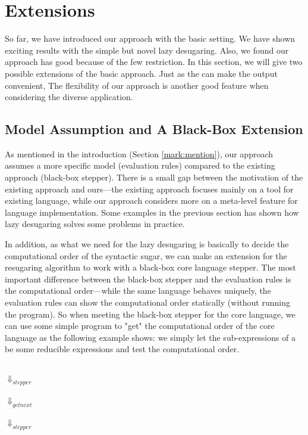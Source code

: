 \section{Extensions}
\label{sec:ext}

So far, we have introduced our approach with the basic setting. We have shown exciting results with the simple but novel lazy desugaring. Also, we found our approach has good because of the few restriction. In this section, we will give two possible extensions of the basic approach. Just as the  can make the output convenient, The flexibility of our approach is another good feature when considering the diverse application.

\subsection{Model Assumption and A Black-Box Extension}


As mentioned in the introduction (Section \ref{mark:mention}), our approach assumes a more specific model (evaluation rules) compared to the existing approach (black-box stepper). There is a small gap between the motivation of the existing approach and ours---the existing approach focuses mainly on a tool for existing language, while our approach considers more on a meta-level feature for language implementation. Some examples in the previous section has shown how lazy desugaring solves some problems in practice.

In addition, as what we need for the lazy desugaring is basically to decide the computational order of the syntactic sugar, we can make an extension for the resugaring algorithm to work with a black-box core language stepper. The most important difference between the black-box stepper and the evaluation rules is the computational order---while the same language behaves uniquely, the evaluation rules can show the computational order statically (without running the program). So when meeting the black-box stepper for the core language, we can use some simple program to "get" the computational order of the core language as the following example shows: we simply let the sub-expressions of a  be some reducible expressions and test the computational order.

\begin{center}
	\\ $\Downarrow_{stepper}$\\  \\ $\Downarrow_{getnext}$\\ \\ $\Downarrow_{stepper}$\\ \qquad{}\\
\end{center}


